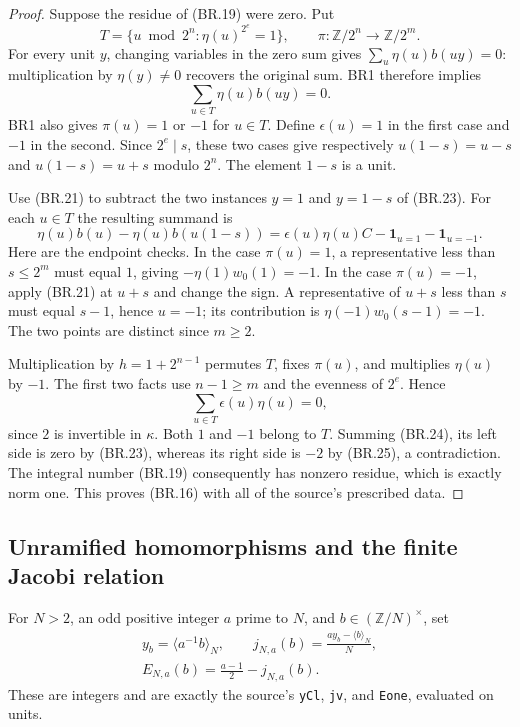 \begin{proof}
Suppose the residue of (BR.19) were zero.  Put
\[
 T=\{u\bmod2^n:\eta(u)^{2^e}=1\},\qquad
 \pi:\mathbb Z/2^n\longrightarrow\mathbb Z/2^m.
 \tag{BR.22}
\]
For every unit $y$, changing variables in the zero sum gives
$\sum_u\eta(u)b(uy)=0$: multiplication by $\eta(y)\ne0$
recovers the original sum.  BR1 therefore implies
\[
                         \sum_{u\in T}\eta(u)b(uy)=0.
                         \tag{BR.23}
\]
BR1 also gives $\pi(u)=1$ or $-1$ for $u\in T$.
Define $\epsilon(u)=1$ in the first case and $-1$ in the second.
Since $2^e\mid s$, these two cases give respectively
$u(1-s)=u-s$ and $u(1-s)=u+s$ modulo $2^n$.
The element $1-s$ is a unit.

Use (BR.21) to subtract the two instances $y=1$ and $y=1-s$
of (BR.23).  For each $u\in T$ the resulting summand is
\[
 \eta(u)b(u)-\eta(u)b(u(1-s))
     =\epsilon(u)\eta(u)C-\mathbf1_{u=1}-\mathbf1_{u=-1}.
 \tag{BR.24}
\]
Here are the endpoint checks.  In the case $\pi(u)=1$,
a representative less than $s\le2^m$ must equal $1$,
giving $-\eta(1)w_0(1)=-1$.
In the case $\pi(u)=-1$, apply (BR.21) at $u+s$ and change
the sign.  A representative of $u+s$ less than $s$ must
equal $s-1$, hence $u=-1$; its contribution is
$\eta(-1)w_0(s-1)=-1$.
The two points are distinct since $m\ge2$.

Multiplication by $h=1+2^{n-1}$ permutes $T$, fixes $\pi(u)$,
and multiplies $\eta(u)$ by $-1$.  The first two facts use
$n-1\ge m$ and the evenness of $2^e$.  Hence
\[
                         \sum_{u\in T}\epsilon(u)\eta(u)=0,
                         \tag{BR.25}
\]
since $2$ is invertible in $\kappa$.
Both $1$ and $-1$ belong to $T$.  Summing (BR.24), its left
side is zero by (BR.23), whereas its right side is $-2$ by
(BR.25), a contradiction.
The integral number (BR.19) consequently has nonzero residue,
which is exactly norm one.  This proves (BR.16) with all of
the source's prescribed data.
\end{proof}

\subsection{Unramified homomorphisms and the finite Jacobi relation}

For $N>2$, an odd positive integer $a$ prime to $N$, and
$b\in(\mathbb Z/N)^\times$, set
\[
 \begin{gathered}
 y_b=\langle a^{-1}b\rangle_N,\qquad
 j_{N,a}(b)=\frac{a y_b-\langle b\rangle_N}{N},\\
 E_{N,a}(b)=\frac{a-1}{2}-j_{N,a}(b).
 \end{gathered}
 \tag{BR.26}
\]
These are integers and are exactly the source's \texttt{yCl},
\texttt{jv}, and \texttt{Eone}, evaluated on units.

